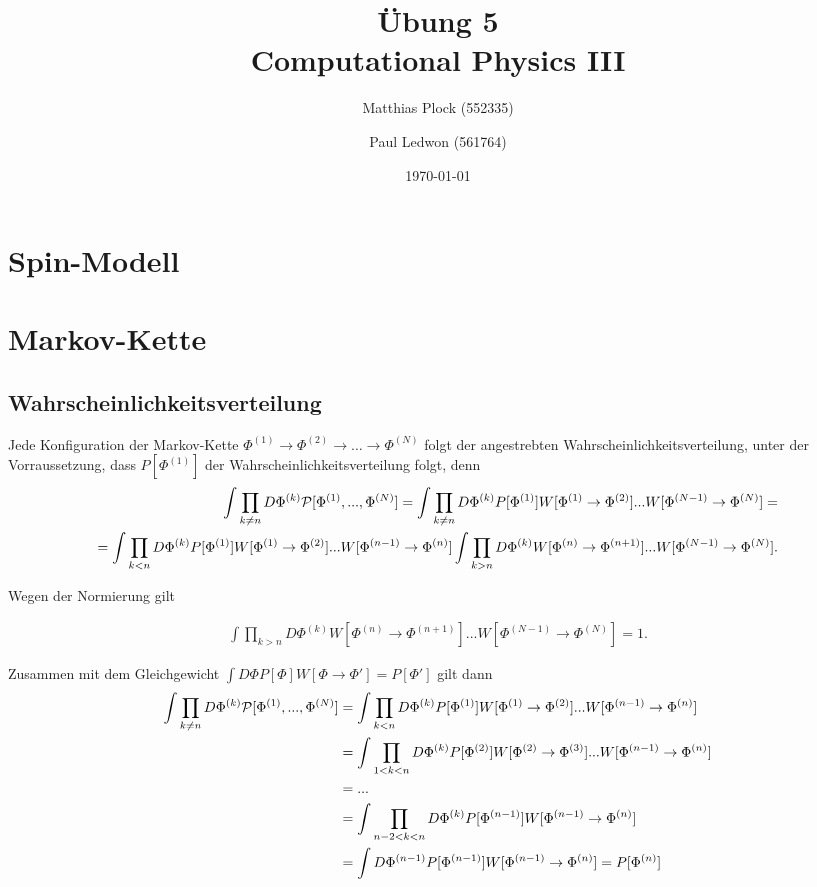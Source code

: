 \documentclass[10pt,a4paper]{article}
\title{Übung 5 \\Computational Physics III}
\author{Matthias Plock (552335) \and Paul Ledwon (561764)} %
\date{\today}
\begin{document}
\maketitle
\tableofcontents

\pagestyle{myheadings}                  %

\section{Spin-Modell}






\section{Markov-Kette}

\subsection{Wahrscheinlichkeitsverteilung}
Jede Konfiguration der Markov-Kette $\Phi^{(1)}\to \Phi^{(2)}\to\dots\to \Phi^{(N)}$
folgt der angestrebten Wahrscheinlichkeitsverteilung, unter der Vorraussetzung,
dass $P[\Phi^{(1)}]$ der Wahrscheinlichkeitsverteilung folgt, denn \\

 \begin{align*}
	\int \prod_{k\neq n} D\Phi^{(k)} {\cal P}[\Phi^{(1)},...,\Phi^{(N)}] = \int \prod_{k\neq n} D\Phi^{(k)}P[\Phi^{(1)}] W[\Phi^{(1)}\to \Phi^{(2)}]...W[\Phi^{(N-1)}\to \Phi^{(N)}]= \\
	=\int \prod_{k <  n} D\Phi^{(k)}P[\Phi^{(1)}] W[\Phi^{(1)}\to \Phi^{(2)}]...W[\Phi^{(n-1)}\to \Phi^{(n)}] \int \prod_{k > n} D\Phi^{(k)} W[\Phi^{(n)}\to \Phi^{(n+1)}]...W[\Phi^{(N-1)}\to \Phi^{(N)}].
 \end{align*}

Wegen der Normierung gilt

 \begin{align*}
	\int \prod_{k > n} D\Phi^{(k)} W[\Phi^{(n)}\to \Phi^{(n+1)}]...W[\Phi^{(N-1)}\to \Phi^{(N)}]=1.
 \end{align*}

Zusammen mit dem Gleichgewicht $\int D\Phi P[\Phi] W[\Phi\to \Phi'] = P[\Phi']$ gilt dann
 \begin{align*}
      \int \prod_{k\neq n} D\Phi^{(k)} {\cal P}[\Phi^{(1)},...,\Phi^{(N)}] &= \int \prod_{k <  n} D\Phi^{(k)}P[\Phi^{(1)}] W[\Phi^{(1)}\to \Phi^{(2)}]...W[\Phi^{(n-1)}\to \Phi^{(n)}] \\
&=\int \prod_{1 < k <  n} D\Phi^{(k)}P[\Phi^{(2)}] W[\Phi^{(2)}\to \Phi^{(3)}]...W[\Phi^{(n-1)}\to \Phi^{(n)}]\\
&= ...\\
&=\int \prod_{n-2 < k <  n} D\Phi^{(k)}P[\Phi^{(n-1)}] W[\Phi^{(n-1)}\to \Phi^{(n)}] \\
&=\int  D\Phi^{(n-1)}P[\Phi^{(n-1)}] W[\Phi^{(n-1)}\to \Phi^{(n)}] = P[\Phi^{(n)}]
 \end{align*}
\end{document}

